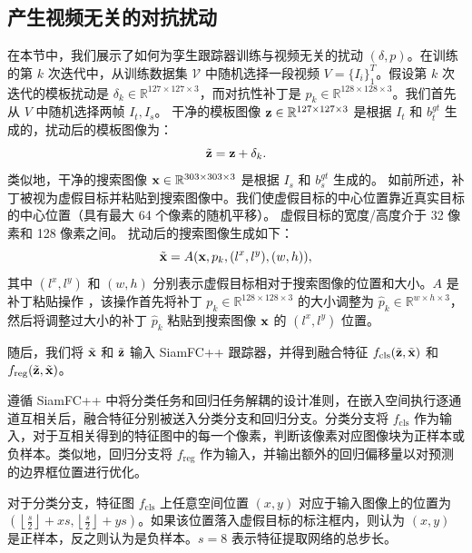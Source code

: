 \subsection{产生视频无关的对抗扰动}
在本节中，我们展示了如何为孪生跟踪器训练与视频无关的扰动 $(\delta, p)$。在训练的第 $k$ 次迭代中，从训练数据集 $\mathcal V$ 中随机选择一段视频 $V=\{I_i\}_1^T$。假设第 $k$ 次迭代的模板扰动是 $\delta_k \in \mathbb{R}^{127\times 127 \times 3}$，而对抗性补丁是 $p_k \in \mathbb{R}^{128\times 128\times 3}$。我们首先从 $V$ 中随机选择两帧 $I_t, I_s$。
干净的模板图像 $\textbf z\in \mathbb{R}^{127\times 127 \times 3}$ 是根据 $I_t$ 和 $b^{gt}_t$ 生成的，扰动后的模板图像为：
\begin{equation}
\tilde {\textbf z} = \textbf z + \delta_k.
\end{equation}
类似地，干净的搜索图像 $\textbf x \in \mathbb{R}^{303\times 303 \times 3}$ 是根据 $I_s$ 和 $b^{gt}_s$ 生成的。
如前所述，补丁被视为虚假目标并粘贴到搜索图像中。我们使虚假目标的中心位置靠近真实目标的中心位置（具有最大 64 个像素的随机平移）。
虚假目标的宽度/高度介于 32 像素和 128 像素之间。
扰动后的搜索图像生成如下：
\begin{equation}
\tilde{\textbf x} = A(\textbf x, p_k, (l^x, l^y), (w, h)),
\end{equation}
其中 $(l^x, l^y)$ 和 $(w, h)$ 分别表示虚假目标相对于搜索图像的位置和大小。$A$ 是补丁粘贴操作 \cite{patch}，该操作首先将补丁 $p_k \in \mathbb{R}^{128\times 128\times 3}$ 的大小调整为 $\hat{p}_k \in \mathbb{R}^{w\times h\times 3}$，然后将调整过大小的补丁 $\hat{p}_k$ 粘贴到搜索图像 $\textbf x$ 的 $(l^x,l^y)$ 位置。

随后，我们将 $\tilde {\textbf x}$ 和 $\tilde{\textbf z}$ 输入 SiamFC++ 跟踪器，并得到融合特征 $f_{\mathrm{cls}}(\tilde{\textbf z}, \tilde {\textbf x})$ 和 $f_{\mathrm{reg}}(\tilde{\textbf z}, \tilde {\textbf x})$。

遵循 SiamFC++ \cite{SiamFC++} 中将分类任务和回归任务解耦的设计准则，在嵌入空间执行逐通道互相关后，融合特征分别被送入分类分支和回归分支。分类分支将 $f_{\mathrm{cls}}$ 作为输入，对于互相关得到的特征图中的每一个像素，判断该像素对应图像块为正样本或负样本。类似地，回归分支将 $f_{\mathrm{reg}}$ 作为输入，并输出额外的回归偏移量以对预测的边界框位置进行优化。

对于分类分支，特征图 $f_{\mathrm{cls}}$ 上任意空间位置 $(x,y)$ 对应于输入图像上的位置为 $\left(\left\lfloor\frac{s}{2}\right\rfloor+x s,\left\lfloor\frac{s}{2}\right\rfloor+y s\right)$。如果该位置落入虚假目标的标注框内，则认为 $(x,y)$ 是正样本，反之则认为是负样本。$s=8$ 表示特征提取网络的总步长。

